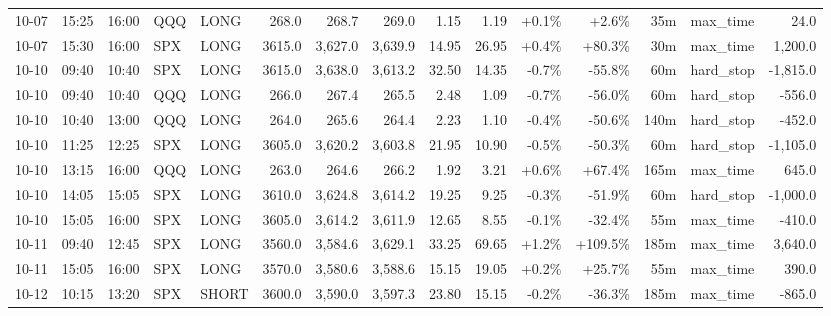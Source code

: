 \documentclass[11pt,a4paper,twoside]{article}
\begin{document}
\begin{landscape}
\begin{center}
\begin{longtable}{>{\color{txtmain}}l l l l l r r r r r r r r >{\color{txtmain}}l r}
10-07 & 15:25 & 16:00 & QQQ & LONG & 268.0 & 268.7 & 269.0 & 1.15 & 1.19 & \textcolor{wingreen}{+0.1\%} & \textcolor{wingreen}{+2.6\%} & 35m & max\_time & \textcolor{wingreen}{24.0} \\
10-07 & 15:30 & 16:00 & SPX & LONG & 3615.0 & 3,627.0 & 3,639.9 & 14.95 & 26.95 & \textcolor{wingreen}{+0.4\%} & \textcolor{wingreen}{+80.3\%} & 30m & max\_time & \textcolor{wingreen}{1,200.0} \\
10-10 & 09:40 & 10:40 & SPX & LONG & 3615.0 & 3,638.0 & 3,613.2 & 32.50 & 14.35 & \textcolor{lossred}{-0.7\%} & \textcolor{lossred}{-55.8\%} & 60m & hard\_stop & \textcolor{lossred}{-1,815.0} \\
10-10 & 09:40 & 10:40 & QQQ & LONG & 266.0 & 267.4 & 265.5 & 2.48 & 1.09 & \textcolor{lossred}{-0.7\%} & \textcolor{lossred}{-56.0\%} & 60m & hard\_stop & \textcolor{lossred}{-556.0} \\
10-10 & 10:40 & 13:00 & QQQ & LONG & 264.0 & 265.6 & 264.4 & 2.23 & 1.10 & \textcolor{lossred}{-0.4\%} & \textcolor{lossred}{-50.6\%} & 140m & hard\_stop & \textcolor{lossred}{-452.0} \\
10-10 & 11:25 & 12:25 & SPX & LONG & 3605.0 & 3,620.2 & 3,603.8 & 21.95 & 10.90 & \textcolor{lossred}{-0.5\%} & \textcolor{lossred}{-50.3\%} & 60m & hard\_stop & \textcolor{lossred}{-1,105.0} \\
10-10 & 13:15 & 16:00 & QQQ & LONG & 263.0 & 264.6 & 266.2 & 1.92 & 3.21 & \textcolor{wingreen}{+0.6\%} & \textcolor{wingreen}{+67.4\%} & 165m & max\_time & \textcolor{wingreen}{645.0} \\
10-10 & 14:05 & 15:05 & SPX & LONG & 3610.0 & 3,624.8 & 3,614.2 & 19.25 & 9.25 & \textcolor{lossred}{-0.3\%} & \textcolor{lossred}{-51.9\%} & 60m & hard\_stop & \textcolor{lossred}{-1,000.0} \\
10-10 & 15:05 & 16:00 & SPX & LONG & 3605.0 & 3,614.2 & 3,611.9 & 12.65 & 8.55 & \textcolor{lossred}{-0.1\%} & \textcolor{lossred}{-32.4\%} & 55m & max\_time & \textcolor{lossred}{-410.0} \\
10-11 & 09:40 & 12:45 & SPX & LONG & 3560.0 & 3,584.6 & 3,629.1 & 33.25 & 69.65 & \textcolor{wingreen}{+1.2\%} & \textcolor{wingreen}{+109.5\%} & 185m & max\_time & \textcolor{wingreen}{3,640.0} \\
10-11 & 15:05 & 16:00 & SPX & LONG & 3570.0 & 3,580.6 & 3,588.6 & 15.15 & 19.05 & \textcolor{wingreen}{+0.2\%} & \textcolor{wingreen}{+25.7\%} & 55m & max\_time & \textcolor{wingreen}{390.0} \\
10-12 & 10:15 & 13:20 & SPX & SHORT & 3600.0 & 3,590.0 & 3,597.3 & 23.80 & 15.15 & \textcolor{lossred}{-0.2\%} & \textcolor{lossred}{-36.3\%} & 185m & max\_time & \textcolor{lossred}{-865.0} \\

\end{longtable}
\end{center}
\end{landscape}
\end{document}
